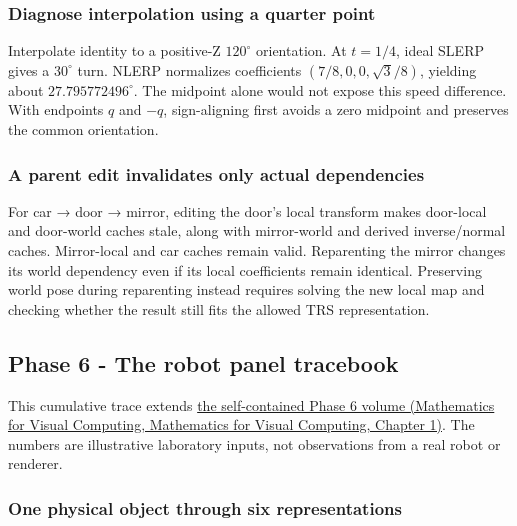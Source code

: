 \subsubsection{Diagnose interpolation using a quarter point}\label{appendix-92ff77d4dfdc-diagnose-interpolation-using-a-quarter-point}

Interpolate identity to a positive-Z \(120^\circ\) orientation. At \(t=1/4\), ideal SLERP gives a \(30^\circ\) turn. NLERP normalizes coefficients \((7/8,0,0,\sqrt3/8)\), yielding about \(27.795772496^\circ\). The midpoint alone would not expose this speed difference. With endpoints \(q\) and \(-q\), sign-aligning first avoids a zero midpoint and preserves the common orientation.

\subsubsection{A parent edit invalidates only actual dependencies}\label{appendix-92ff77d4dfdc-a-parent-edit-invalidates-only-actual-dependencies}

For car → door → mirror, editing the door's local transform makes door-local and door-world caches stale, along with mirror-world and derived inverse/normal caches. Mirror-local and car caches remain valid. Reparenting the mirror changes its world dependency even if its local coefficients remain identical. Preserving world pose during reparenting instead requires solving the new local map and checking whether the result still fits the allowed TRS representation.

\subsection{Phase 6 - The robot panel tracebook}\label{appendix-92ff77d4dfdc-phase-6---the-robot-panel-tracebook}

This cumulative trace extends \href{../02-Mathematics-for-Visual-Computing/main.pdf\#nameddest=01-foundations-i-ch017-the-panel-gives-us-a-reason-to-learn}{the self-contained Phase 6 volume (Mathematics for Visual Computing, Mathematics for Visual Computing, Chapter 1)}. The numbers are illustrative laboratory inputs, not observations from a real robot or renderer.

\subsubsection{One physical object through six representations}\label{appendix-92ff77d4dfdc-one-physical-object-through-six-representations}

